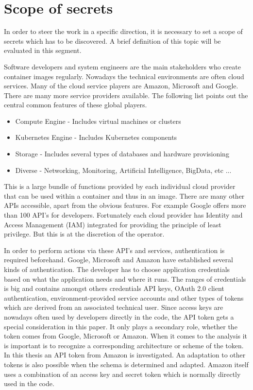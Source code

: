 \section{Scope of secrets}
\label{ch:theory:scope_secrets}
In order to steer the work in a specific direction, it is necessary to set a scope of secrets which has to be discovered. A brief definition of this topic will be evaluated in this segment.

Software developers and system engineers are the main stakeholders who create container images regularly. Nowadays the technical environments are often cloud services. Many of the cloud service players are Amazon, Microsoft and Google. There are many more service providers available. The following list points out the central common features of these global players.
\begin{itemize}
\item Compute Engine - Includes virtual machines or clusters
\item Kubernetes Engine - Includes Kubernetes components
\item Storage - Includes several types of databases and hardware provisioning
\item Diverse - Networking, Monitoring, Artificial Intelligence, BigData, etc ...
\end{itemize}

This is a large bundle of functions provided by each individual cloud provider that can be used within a container and thus in an image.
There are many other APIs accessible, apart from the obvious features. For example Google offers more than 100 API's for developers.
Fortunately each cloud provider has Identity and Access Management (IAM) integrated for providing the principle of least privilege. But this is at the discretion of the operator.

In order to perform actions via these API's and services, authentication is required beforehand. Google, Microsoft and Amazon have established several kinds of authentication. 
The developer has to choose application credentials based on what the application needs and where it runs.
The ranges of credentials is big and contains amongst others credentials API keys, OAuth 2.0 client authentication, environment-provided service accounts and other types of tokens which are derived from an associated technical user.
Since access keys are nowadays often used by developers directly in the code, the API token gets a special consideration in this paper.
It only plays a secondary role, whether the token comes from Google, Microsoft or Amazon. When it comes to the analysis it is important is to recognize a corresponding architecture or scheme of the token.
In this thesis an API token from Amazon is investigated. An adaptation to other tokens is also possible when the schema is determined and adapted.
Amazon itself uses a combination of an access key and secret token which is normally directly used in the code.

